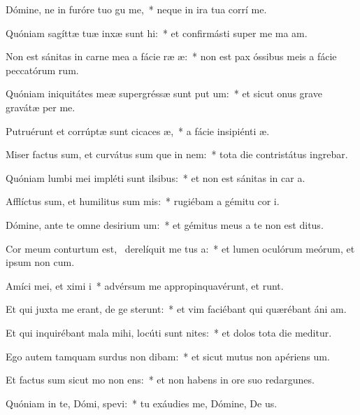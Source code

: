 \item Dómine, ne in furóre tuo gu me,~* neque in ira tua corrí me.
\item Quóniam sagíttæ tuæ inxæ sunt hi:~* et confirmásti super me ma am.
\item Non est sánitas in carne mea a fácie ræ æ:~* non est pax óssibus meis a fácie peccatórum rum.
\item Quóniam iniquitátes meæ supergréssæ sunt put um:~* et sicut onus grave gravátæ  per me.
\item Putruérunt et corrúptæ sunt cicaces æ,~* a fácie insipiénti æ.
\item Miser factus sum, et curvátus sum que in nem:~* tota die contristátus ingrebar.
\item Quóniam lumbi mei impléti sunt ilsibus:~* et non est sánitas in car a.
\item Afflíctus sum, et humilitus sum mis:~* rugiébam a gémitu cor i.
\item Dómine, ante te omne desirium um:~* et gémitus meus a te non est ditus.
\item Cor meum conturtum est,~\pscross{} derelíquit me tus a:~* et lumen oculórum meórum, et ipsum non  cum.
\item Amíci mei, et ximi i~* advérsum me appropinquavérunt, et runt.
\item Et qui juxta me erant, de ge sterunt:~* et vim faciébant qui quærébant áni am.
\item Et qui inquirébant mala mihi, locúti sunt nites:~* et dolos tota die meditur.
\item Ego autem tamquam surdus non dibam:~* et sicut mutus non apériens  um.
\item Et factus sum sicut mo non ens:~* et non habens in ore suo redargunes.
\item Quóniam in te, Dómi, spevi:~* tu exáudies me, Dómine, De us.
